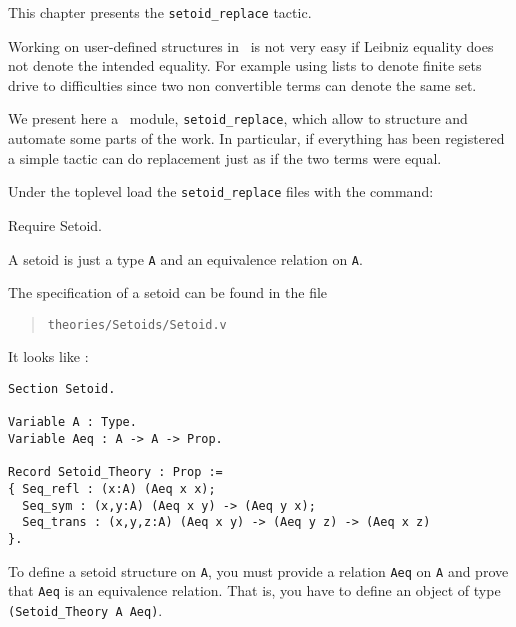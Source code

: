 \label{setoid_replace}

This chapter presents  the \texttt{setoid\_replace} tactic.


Working on user-defined structures in \Coq\ is not very easy if
Leibniz equality does not denote the intended equality. For example
using lists to denote finite sets drive to difficulties since two
non convertible terms can denote the same set.

We present here a \Coq\ module, {\tt setoid\_replace}, which allow to
structure and automate some parts of the work. In particular, if
everything has been registered a simple
tactic can do replacement just as if the two terms were equal.


Under the toplevel
load the \texttt{setoid\_replace} files with the command:

\begin{coq_example*}
  Require Setoid.
\end{coq_example*}

A setoid is just a type \verb+A+ and an equivalence relation on \verb+A+.

The specification of a setoid can be found in the file

\begin{quotation}
\begin{verbatim}
theories/Setoids/Setoid.v
\end{verbatim}
\end{quotation}

It looks like :
\begin{small}
\begin{flushleft}
\begin{verbatim}
Section Setoid.

Variable A : Type.
Variable Aeq : A -> A -> Prop.

Record Setoid_Theory : Prop :=
{ Seq_refl : (x:A) (Aeq x x);
  Seq_sym : (x,y:A) (Aeq x y) -> (Aeq y x);
  Seq_trans : (x,y,z:A) (Aeq x y) -> (Aeq y z) -> (Aeq x z)
}.
\end{verbatim}
\end{flushleft}
\end{small}

To define a setoid structure on \verb+A+, you must provide a relation
\verb|Aeq| on \verb+A+ and prove that \verb|Aeq| is an equivalence
relation. That is, you have to define an object of type
\verb|(Setoid_Theory A Aeq)|.

